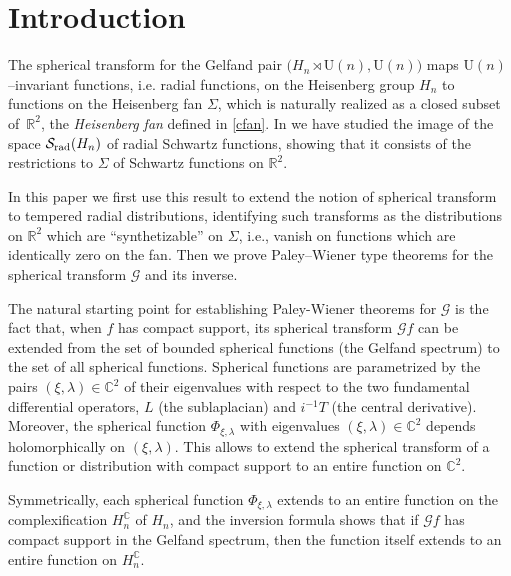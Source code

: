 \documentclass[12pt,a4paper]{amsart}
\theoremstyle{plain}
\theoremstyle{definition}
\numberwithin{equation}{section}
\begin{document}
 
 

\section{Introduction}

The spherical transform for the Gelfand pair $\big({{H_{n}}}\rtimes{{\text{U}({n})}},{{\text{U}({n})}}\big)$ maps ${{\text{U}({n})}}$--invariant
functions, i.e. radial functions,
on the Heisenberg group ${{H_{n}}}$ to functions on the Heisenberg fan $\Sigma$, 
which is naturally realized as a closed subset of~${\mathbb R}^2$, the {\it Heisenberg fan} defined in \eqref{cfan}. 
In \cite{ADR,ADR1} we have studied the image of the space ${{\mathcal S}_{\text{\rm rad}}({{H_{n}}})}$ of radial Schwartz functions, 
showing that it consists of the restrictions to $\Sigma$ of Schwartz functions on ${\mathbb R}^2$.

In this paper we first use this result to extend the notion of spherical transform 
to tempered radial distributions, identifying such transforms 
as the distributions on ${\mathbb R}^2$ which are ``synthetizable''   on $\Sigma$, i.e., 
vanish on functions which are  identically zero on the fan.
Then we prove Paley--Wiener type theorems
for the spherical transform ${\mathcal G} $ and its inverse.

The natural starting point   for establishing Paley-Wiener theorems for ${\mathcal G}$ is the fact that, when $f$ has compact support, its spherical transform ${\mathcal G} f$ can be extended
from the set of bounded spherical functions (the Gelfand spectrum) to the set of all spherical 
functions. Spherical functions are parametrized by the pairs $(\xi,\lambda)\in{\mathbb C}^2$ of their 
eigenvalues with respect to the two fundamental differential operators, $L$ (the sublaplacian) and 
$i{^{-1}} T$ (the central derivative).    Moreover, the
spherical function $\Phi_{\xi,\lambda}$ with eigenvalues $(\xi,\lambda)\in{\mathbb C}^2$ depends holomorphically on $(\xi,\lambda)$.
This allows to extend the  spherical transform of a function or distribution
with compact support to an entire function on ${\mathbb C}^2$.

Symmetrically, each spherical function $\Phi_{\xi,\lambda}$ extends to an entire function 
on the complexification  $ H_n^{\mathbb C}$ of ${{H_{n}}}$, and  the inversion formula shows that 
if   ${\mathcal G} f$  has compact support in the Gelfand spectrum, then 
the function itself extends to an entire function   on $H_n^{\mathbb C}$.
\end{document}
